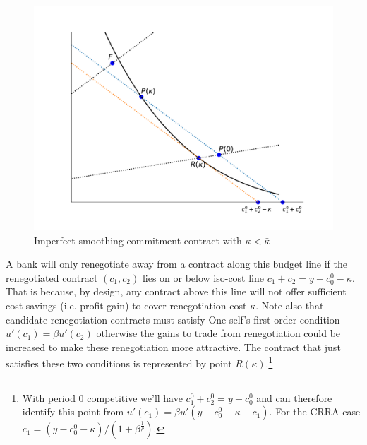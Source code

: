 \documentclass[11pt,english]{article}
\theoremstyle{plain}
\theoremstyle{definition}
\begin{document}
\begin{figure}
  \includegraphics[width=1\textwidth]{CompetitiveRP.pdf}
  \caption{Imperfect smoothing commitment contract with $\kappa<\bar{\kappa}$}
  \label{fig:compRP} 
\end{figure}

A bank will only renegotiate away from a contract along this
budget line if the renegotiated contract $(c_{1},c_{2})$ lies on
or below iso-cost line $c_{1}+c_{2}=y-c_{0}^{0}-\kappa$. That is
because, by design, any contract above this line will not offer sufficient
cost savings (i.e. profit gain) to cover renegotiation cost $\kappa$.
Note also that candidate renegotiation contracts must satisfy One-self's
first order condition $u'(c_{1})=\beta u'(c_{2})$ \textendash{} otherwise
the gains to trade from renegotiation could be increased to make these
renegotiation more attractive. The contract that just satisfies these
two conditions is represented by point $R(\kappa)$.\footnote{With period 0 competitive we'll have $c_{1}^{0}+c_{2}^{0}=y-c_{0}^{0}$
and can therefore identify this point from $u'(c_{1})=\beta u'(y-c_{0}^{0}-\kappa-c_{1})$.
For the CRRA case $c_{1}=(y-c_{0}^{0}-\kappa)/(1+\beta^{\frac{1}{\rho}})$.}
\end{document}
